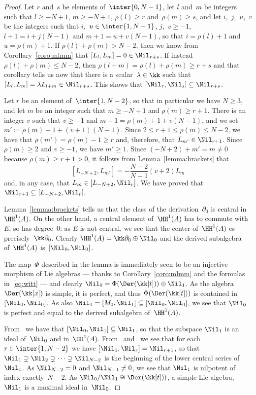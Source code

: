 \begin{proof}
 Let $r$ and~$s$ be elements of~$\inter{0,N-1}$, let $l$ and~$m$
be integers such that $l\geq-N+1$, $m\geq-N+1$, $\rho(l)\geq r$
and~$\rho(m)\geq s$, and let $i$,~$j$,~$u$,~$v$ be the integers such that
$i$,~$u\in\inter{1,N-1}$, $j$,~$v\geq-1$, $l+1=i+j(N-1)$ and
$m+1=u+v(N-1)$, so that $i=\rho(l)+1$ and $u=\rho(m)+1$. If
$\rho(l)+\rho(m)>N-2$, then we know from Corollary~\ref{coro:mlmm} that
$[L_l,L_m]=0\in\Nil_{r+s}$. If instead $\rho(l)+\rho(m)\leq N-2$, then
$\rho(l+m)=\rho(l)+\rho(m)\geq r+s$ and that corollary tells us now that
there is a scalar~$\lambda\in\kk$ such that $[L_l,L_m]=\lambda
L_{l+m}\in\Nil_{r+s}$. This shows that
$[\Nil_r,\Nil_s]\subseteq\Nil_{r+s}$.

 Let $r$ be an element of~$\inter{1,N-2}$, so that in particular
we have $N\geq3$, and let $m$ be an integer such that $m\geq-N+1$ and
$\rho(m)\geq r+1$. There is an integer $v$ such that $v\geq-1$ and
$m+1=\rho(m)+1+v(N-1)$, and we set $m'\coloneqq\rho(m)-1+(v+1)(N-1)$. Since
$2\leq r+1\leq \rho(m)\leq N-2$, we have that $\rho(m')=\rho(m)-1\geq r$ and,
therefore, that $L_{m'}\in\Nil_{r+1}$. Since $\rho(m)\geq2$ and
$v\geq-1$, we have $m'\geq1$. Since $(-N+2)+m'=m\neq0$ because
$\rho(m)\geq r+1>0$, it follows from Lemma~\ref{lemma:brackets} that
  \[
  [L_{-N+2},L_{m'}]
        = -\frac{N-2}{N-1}(v+2)L_{m}
  \]
and, in any case, that $L_m\in[L_{-N+2},\Nil_r]$. We have
proved that $\Nil_{r+1}\subseteq[L_{-N+2},\Nil_r]$.

\bigskip

Lemma~\ref{lemma:brackets} tells us that the class of the
derivation~$\partial_0$ is central in~$\HH^1(A)$. On the other hand, a
central element of~$\HH^1(A)$ has to commute with $E$, so has
degree~$0$: as $E$ is not central, we see that the center of~$\HH^1(A)$
es precisely~$\kk\partial_0$. Clearly $\HH^1(A)=\kk\partial_0\oplus\Nil_0$
and the derived subalgebra of~$\HH^1(A)$ is~$[\Nil_0,\Nil_0]$.

The map~$\Phi$ described in the lemma is immediately seen to be an
injective morphism of Lie algebras --- thanks to Corollary~\ref{coro:mlmm}
and the formulas in~\eqref{eq:witt} --- and clearly
$\Nil_0=\Phi(\Der(\kk[t]))\oplus\Nil_1$.
As the algebra~$\Der(\kk[x])$ is simple, it is perfect, and thus
$\Phi(\Der(\kk[t]))$ is contained in~$[\Nil_0,\Nil_0]$. As also
$\Nil_1=[M_0,\Nil_1]\subseteq[\Nil_0,\Nil_0]$, we see that $\Nil_0$ is
perfect and equal to the derived subalgebra of~$\HH^1(A)$.

From~ we have that $[\Nil_0,\Nil_1]\subseteq\Nil_1$, so that the
subspace $\Nil_1$ is an ideal of~$\Nil_0$ and in~$\HH^1(A)$.
From~ and~ we see that for each $r\in\inter{1,N-2}$
we have $[\Nil_1,\Nil_r]=\Nil_{r+1}$, so that
$\Nil_1\supsetneq\Nil_2\supsetneq\cdots\supsetneq\Nil_{N-2}$ is the
beginning of the lower central series of~$\Nil_1$. As $\Nil_{N-2}=0$ and
$\Nil_{N-1}\neq0$, we see that $\Nil_1$ is nilpotent of index
exactly~$N-2$. As $\Nil_0/\Nil_1\cong\Der(\kk[t]))$, a simple Lie
algebra, $\Nil_1$ is a maximal ideal in~$\Nil_0$. 


\end{proof}
